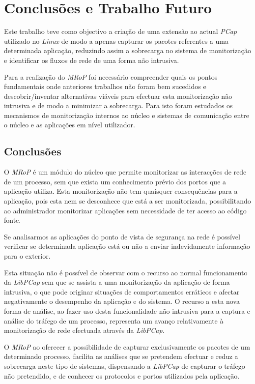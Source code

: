 \chapter{Conclusões e Trabalho Futuro}
\label{cap:conclusao}

Este trabalho teve como objectivo a criação de uma extensão ao actual \textit{PCap} utilizado no \textit{Linux} de modo a apenas capturar os pacotes referentes a uma determinada aplicação, reduzindo assim a sobrecarga no sistema de monitorização e identificar os fluxos de rede de uma forma não intrusiva.

Para a realização do \textit{MRoP} foi necessário compreender quais os pontos fundamentais onde anteriores trabalhos não foram bem sucedidos e descobrir/inventar alternativas viáveis para efectuar esta monitorização não intrusiva e de modo a minimizar a sobrecarga.
Para isto foram estudados os mecanismos de monitorização internos ao núcleo e sistemas de comunicação entre o núcleo e as aplicações em nível utilizador.



\section{Conclusões}
\label{sec:conclusoes}

O \textit{MRoP} é um módulo do núcleo que permite monitorizar as interacções de rede de um processo, sem que exista um conhecimento prévio dos portos que a aplicação utiliza.
Esta monitorização não tem quaisquer consequências para a aplicação, pois esta nem se desconhece que está a ser monitorizada, possibilitando ao administrador monitorizar aplicações sem necessidade de ter acesso ao código fonte.

Se analisarmos as aplicações do ponto de vista de segurança na rede é possível verificar se determinada aplicação está ou não a enviar indevidamente informação para o exterior.

Esta situação não é possível de observar com o recurso ao normal funcionamento da \textit{LibPCap} sem que se assista a uma monitorização da aplicação de forma intrusiva, o que pode originar situações de comportamentos erráticos e afectar negativamente o desempenho da aplicação e do sistema.
O recurso a esta nova forma de análise, ao fazer uso desta funcionalidade não intrusiva para a captura e análise do tráfego de um processo, representa um avanço relativamente à monitorização de rede efectuada através da \textit{LibPCap}.

O \textit{MRoP} ao oferecer a possibilidade de capturar exclusivamente os pacotes de um determinado processo, facilita as análises que se pretendem efectuar e reduz a sobrecarga neste tipo de sistemas, dispensando a \textit{LibPCap} de capturar o tráfego não pretendido, e de conhecer os protocolos e portos utilizados pela aplicação.

